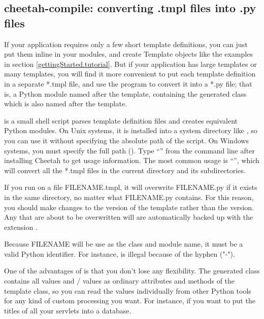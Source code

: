 \subsection{cheetah-compile: converting .tmpl files into .py files}
\label{howWorks.tmpl2py}
\label{howWorks.cheetah-compile}

If your application requires only a few short template definitions, you can
just put them inline in your modules, and create Template objects like the
examples in section \ref{gettingStarted.tutorial}.  But if your application
has large templates or many templates, you will find it more convenient to
put each template definition in a separate *.tmpl file, and use the
 program to convert it into a *.py file; that is, a
Python module named after the template, containing the generated class
which is also named after the template.  

 is a small shell script parses template definition
files and creates equivalent Python modules.  On Unix systems, it is installed
into a system directory like , so you can use it without
specifying the absolute path of the script.  On Windows systems, you must
specify the full path (). Type
``'' from the command line after installing Cheetah to
get usage information.  The most common usage is ``'',
which will convert all the *.tmpl files in the current directory
and its subdirectories.

If you run  on a file FILENAME.tmpl, it will
overwrite FILENAME.py if it exists in the same directory, no matter what
FILENAME.py contains.  For this reason, you should make changes to the
 version of the template rather than the  version.  Any
 that are about to be overwritten will are
automatically backed up with the extension .

Because FILENAME will be use as the class and module name, it must be a valid
Python identifier.  For instance,  is 
illegal because of the hyphen ("-").

One of the advantages of  is that you don't lose any
flexibility.  The generated class contains all  values and
/ values as ordinary attributes and methods of the
template class, so you can read the values individually from other Python
tools for any kind of custom processing you want.  For instance, if you want to
put the titles of all your servlets into a database.

